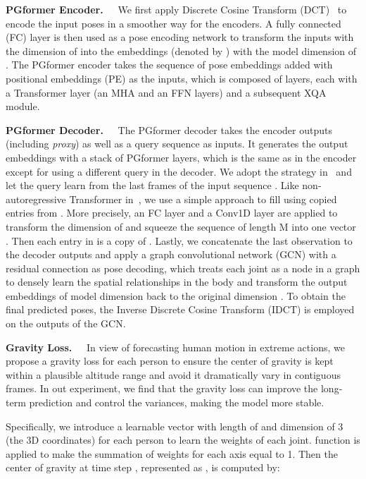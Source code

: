 \documentclass[10pt,twocolumn,letterpaper]{article}
\begin{document}
\vspace{1em}
\noindent\textbf{PGformer Encoder.~~}
We first apply Discrete Cosine Transform (DCT)~\cite{ahmed1974discrete,mao2019learning} to encode the input poses  in a smoother way for the encoders.
A fully connected (FC) layer is then used as a pose encoding network to transform the inputs with the dimension of  into the embeddings (denoted by ) with the model dimension of .
The PGformer encoder takes the sequence of pose embeddings added  with positional embeddings (PE) as the inputs, which is composed of  layers, each with a Transformer layer (an MHA and an FFN layers) and a subsequent XQA module.

\vspace{1em}
\noindent\textbf{PGformer Decoder.~~} 
The PGformer decoder takes the encoder outputs (including \textit{proxy}) as well as a query sequence  as inputs. 
It generates the output embeddings with a stack of  PGformer layers, which is the same as in the encoder except for using a different query in the decoder.
We adopt the strategy in~\cite{guo2021multi} and let the query  learn from the last  frames of the input sequence .
Like non-autoregressive Transformer in~\cite{Martinez_potr_ICCV2021}, we use a simple approach to fill  using copied entries from . 
More precisely, an FC layer and a Conv1D layer are applied to transform the dimension of  and squeeze the sequence of length M into one vector .
Then each entry  in  is a copy of .
Lastly, we concatenate the last observation  to the decoder outputs and apply a graph convolutional network (GCN) with a residual connection as pose decoding, which treats each joint as a node in a graph to densely learn the spatial relationships in the body and transform the output embeddings of model dimension  back to the original dimension .
To obtain the final predicted poses, the Inverse Discrete Cosine Transform (IDCT) is employed on the outputs of the GCN.

\vspace{1em}
\noindent\textbf{Gravity Loss.~~} 
In view of forecasting human motion in extreme actions, we propose a gravity loss for each person to ensure the center of gravity is kept within a plausible altitude range and avoid it dramatically vary in contiguous frames. 
In out experiment, we find that the gravity loss can improve the long-term prediction and control the variances, making the model more stable. 

Specifically, we introduce a learnable vector  with length of  and dimension of 3 (the 3D coordinates) for each person to learn the weights of each joint. 
 function is applied to make the summation of  weights for each axis equal to 1.
Then the center of gravity at time step , represented as , is computed by: 
\vskip -0.15in
\end{document}
